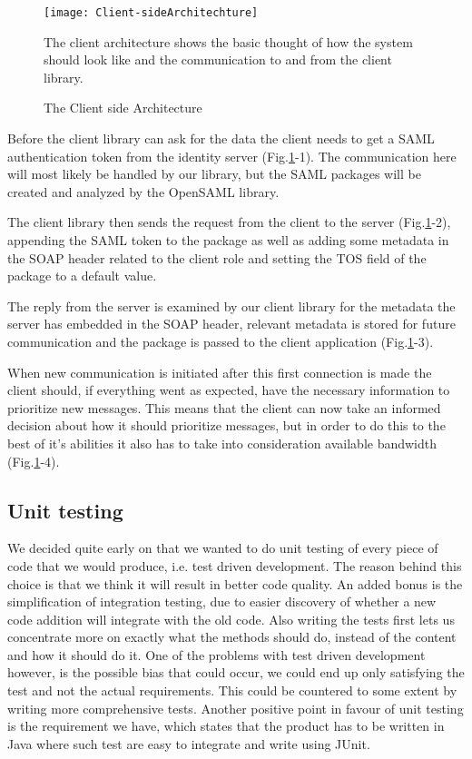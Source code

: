         \begin{figure}[htb]
            \centering
            \texttt{[image: Client-sideArchitechture]}
            \caption{The Client side Architecture}
            The client architecture shows the basic thought of how the system should look like and the communication to and from the client library. 
            \label{fig:Client-sideArchitechture}
        \end{figure}
 
        Before the client library can ask for the data the client needs to get a SAML authentication token from the identity server (Fig.\ref{fig:Client-sideArchitechture}-1). The communication here will most likely be handled by our library, but the SAML packages will be created and analyzed by the OpenSAML library. 

        The client library then sends the request from the client to the server (Fig.\ref{fig:Client-sideArchitechture}-2), appending the SAML token to the package as well as adding some metadata in the SOAP header related to the client role and setting the TOS field of the package to a default value.

        The reply from the server is examined by our client library for the metadata the server has embedded in the SOAP header, relevant metadata is stored for future communication and the package is passed to the client application (Fig.\ref{fig:Client-sideArchitechture}-3).

        When new communication is initiated after this first connection is made the client should, if everything went as expected, have the necessary information to prioritize new messages. This means that the client can now take an informed decision about how it should prioritize messages, but in order to do this to the best of it’s abilities it also has to take into consideration available bandwidth (Fig.\ref{fig:Client-sideArchitechture}-4).
    
    \subsection{Unit testing}\label{Unit testing}
    We decided quite early on that we wanted to do unit testing of every piece of code that we would produce, i.e. test driven development. The reason behind this choice is that we think it will result in better code quality. An added bonus is the simplification of integration testing, due to easier discovery of whether a new code addition will integrate with the old code. Also writing the tests first lets us concentrate more on exactly what the methods should do, instead of the content and how it should do it. One of the problems with test driven development however, is the possible bias that could occur, we could end up only satisfying the test and not the actual requirements. This could be countered to some extent by writing more comprehensive tests. Another positive point in favour of unit testing is the requirement we have, which states that the product has to be written in Java where such test are easy to integrate and write using JUnit.

